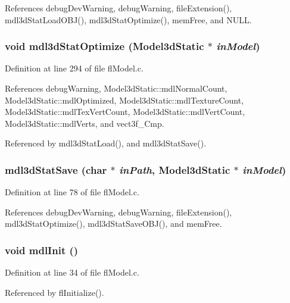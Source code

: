 References debug\-Dev\-Warning, debug\-Warning, file\-Extension(), mdl3d\-Stat\-Load\-OBJ(), mdl3d\-Stat\-Optimize(), mem\-Free, and NULL.
\subsubsection{\setlength{\rightskip}{0pt plus 5cm}void mdl3d\-Stat\-Optimize ({\bf Model3d\-Static} $\ast$ {\em in\-Model})}\label{flModel_8h_f4de6b2e261a216256748986384238a1}




Definition at line 294 of file fl\-Model.c.

References debug\-Warning, Model3d\-Static::mdl\-Normal\-Count, Model3d\-Static::mdl\-Optimized, Model3d\-Static::mdl\-Texture\-Count, Model3d\-Static::mdl\-Tex\-Vert\-Count, Model3d\-Static::mdl\-Vert\-Count, Model3d\-Static::mdl\-Verts, and vect3f\_\-Cmp.

Referenced by mdl3d\-Stat\-Load(), and mdl3d\-Stat\-Save().
\subsubsection{ mdl3d\-Stat\-Save (char $\ast$ {\em in\-Path}, {\bf Model3d\-Static} $\ast$ {\em in\-Model})}\label{flModel_8h_571078f0a72c08e3f00a191a07bbcb58}




Definition at line 78 of file fl\-Model.c.

References debug\-Dev\-Warning, debug\-Warning, file\-Extension(), mdl3d\-Stat\-Optimize(), mdl3d\-Stat\-Save\-OBJ(), and mem\-Free.
\subsubsection{\setlength{\rightskip}{0pt plus 5cm}void mdl\-Init ()}\label{flModel_8h_f881fa3ed05c8767efb292b84b836af3}




Definition at line 34 of file fl\-Model.c.

Referenced by fl\-Initialize().